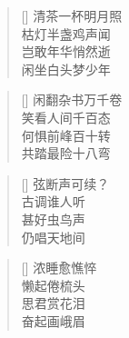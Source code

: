 \renewcommand{\poemtoc}{section}
\settowidth{\versewidth}{四年偏安南隅中}
\begin{verse}[\versewidth]
清茶一杯明月照\\
枯灯半盏鸡声闻\\
岂敢年华悄然逝\\
闲坐白头梦少年\\
\end{verse}

\renewcommand{\poemtoc}{section}
\settowidth{\versewidth}{四年偏安南隅中}
\begin{verse}[\versewidth]
闲翻杂书万千卷\\
笑看人间千百态\\
何惧前峰百十转\\
共踏最险十八弯\\
\end{verse}


\renewcommand{\poemtoc}{section}
\settowidth{\versewidth}{弦断声可续}
\begin{verse}[\versewidth]
弦断声可续？\\
古调谁人听\\
甚好虫鸟声\\
仍唱天地间
\end{verse}

\renewcommand{\poemtoc}{section}
\settowidth{\versewidth}{浓睡愈憔悴}
\begin{verse}[\versewidth]
浓睡愈憔悴\\
懒起倦梳头\\
思君赏花泪\\
奋起画峨眉
\end{verse}
